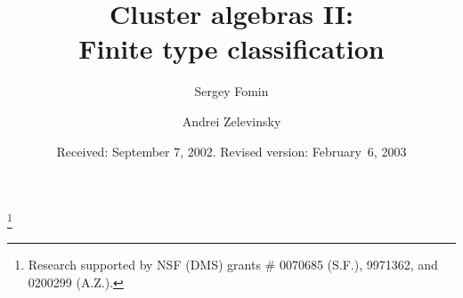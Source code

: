 \documentclass[letterpaper]{amsart}
\numberwithin{equation}{section}
\theoremstyle{definition}
\begin{document}
 
 
\title[Cluster algebras II] 
{Cluster algebras II: \\ 
Finite type classification 
} 
 
 
\author{Sergey Fomin} 
\address{Department of Mathematics, University of Michigan, 
Ann Arbor, MI 48109, USA}  
 
 
\author{Andrei Zelevinsky} 
\address{\noindent Department of Mathematics, Northeastern University, 
 Boston, MA 02115} 
 
 
 
\date{Received: September 7, 2002. Revised version: February~6, 2003} 
 
 \thanks{Research %
supported %
by NSF (DMS) grants \# 0070685 (S.F.), 9971362, and 0200299 (A.Z.).} 
 
 
 
\maketitle 
 
\tableofcontents 
 
\vspace{-.3in} 
 
\pagebreak[3] 
 
 
\end{document}
